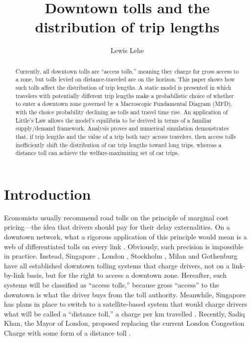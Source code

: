 \documentclass[preprint,authoryear]{elsarticle}
\begin{document}
\title{Downtown tolls and the distribution of trip lengths }

\author[ll]{Lewis Lehe }

\address[ll]{UC Berkeley, Department of Civil and Environmental Engineering \\ lewis500@berkeley.edu \\ http://lewislehe.com}

\begin{abstract}

Currently, all downtown tolls are ``access tolls,'' meaning they charge for gross access to a zone, but tolls levied on distance-traveled are on the horizon. This paper shows how such tolls affect the distribution of trip lengths. A static model is presented in which travelers with potentially different trip lengths make a probabilistic choice of whether to enter a downtown zone governed by a Macroscopic Fundamental Diagram (MFD), with the choice probability declining as tolls and travel time rise. An application of Little's Law allows the model's equilibria to be derived in terms of a familiar supply/demand framework. Analysis proves and numerical simulation demonstrates that, if trip lengths and the value of a trip both vary across travelers, then access tolls inefficiently shift the distribution of car trip lengths toward long trips, whereas a distance toll can achieve the welfare-maximizing set of car trips.

\end{abstract}
\maketitle

\section{Introduction}

Economists usually recommend road tolls on the principle of marginal cost pricing---the idea that drivers should pay for their delay externalities. On a downtown network, what a rigorous application of this principle would mean is a web of differentiated tolls on every link \citep{Beckmann1956,YangHuang1998}. Obviously, such precision is impossible in practice. Instead,  Singapore \citep{Santos2004}, London \citep{santos2008,Leape2006}, Stockholm \citep{Eliasson2014}, Milan \citep{Gibson2015} and Gothenburg \citep{Borjesson2015} have all established downtown tolling systems that charge drivers, not on a link-by-link basis, but for the right to access a downtown zone. Hereafter, such systems will be classified as ``access tolls,'' because gross ``access'' to the downtown is what the driver buys from the toll authority. Meanwhile, Singapore has plans in place to switch to a satellite-based system that would charge drivers what will be called a ``distance toll,'' a charge per km travelled \citep{Tan2016}. Recently, Sadiq Khan, the Mayor of London, proposed replacing the current London Congestion Charge with some form of a distance toll \citep{Topham2017}.
\end{document}
